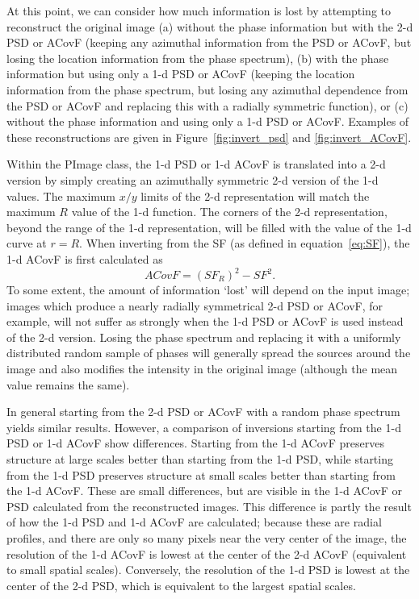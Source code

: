 \documentclass[11pt,preprint]{aastex}
\begin{document}
At this point, we can consider how much information is lost by attempting to reconstruct the original image (a) without the phase information but with the 2-d PSD or ACovF (keeping any azimuthal information from the PSD or ACovF, but losing the location information from the phase spectrum), (b) with the phase information but using only a 1-d PSD or ACovF (keeping the location information from the phase spectrum, but losing any azimuthal dependence from the PSD or ACovF and replacing this with a radially symmetric function), or (c) without the phase information and using only a 1-d PSD or ACovF.  Examples of these reconstructions are given in Figure~\ref{fig:invert_psd} and \ref{fig:invert_ACovF}. 

Within the PImage class, the 1-d PSD or 1-d ACovF is translated into a 2-d version by simply creating an azimuthally symmetric 2-d version of the 1-d values. The maximum $x/y$ limits of the 2-d representation will match the maximum $R$ value of the 1-d  function. The corners of the 2-d representation, beyond the range of the 1-d representation, will be filled with the value of the 1-d curve at $r=R$.  When inverting from the SF (as defined in equation~\ref{eq:SF}), the 1-d ACovF is first calculated as 
\begin{equation}
ACovF = (SF_R)^2 - SF^2.
\end{equation}
To some extent, the amount of information `lost' will depend on the input image; images which produce a nearly radially symmetrical 2-d PSD or ACovF, for example, will not suffer as strongly when the 1-d PSD or ACovF is used instead of the 2-d version. Losing the phase spectrum and replacing it with a uniformly distributed random sample of phases will generally spread the sources around the image and also modifies the intensity in the original image (although the mean value remains the same). 

In general starting from the 2-d PSD or ACovF with a random phase spectrum yields similar results. However, a comparison of inversions starting from the 1-d PSD or 1-d ACovF show differences. Starting from the 1-d ACovF preserves structure at large scales better than starting from the 1-d PSD, while starting from the 1-d PSD preserves structure at small scales better than starting from the 1-d ACovF. These are small differences, but are visible in the 1-d ACovF or PSD calculated from the reconstructed images.  This difference is partly the result of how the 1-d PSD and 1-d ACovF are calculated; because these are radial profiles, and there are only so many pixels near the very center of the image, the resolution of the 1-d ACovF is lowest at the center of the 2-d ACovF (equivalent to small spatial scales). Conversely, the resolution of the 1-d PSD is lowest at the center of the 2-d PSD, which is equivalent to the largest spatial scales. 
\end{document}
